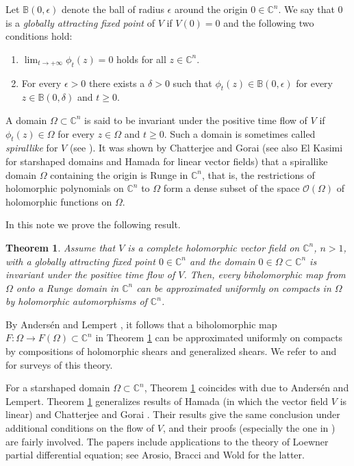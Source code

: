 \documentclass[12pt]{amsart}
\newtheorem{theorem}{Theorem}[section]
\theoremstyle{definition}
\numberwithin{equation}{section}
\numberwithin{figure}{section}
\newcommand\Oscr{\mathscr{O}}
\newcommand\B{\mathbb{B}}
\newcommand\C{\mathbb{C}}
\numberwithin{equation}{section}
\begin{document}
Let $\B(0,\epsilon)$ denote the ball of radius $\epsilon$ around 
the origin $0\in\C^n$. We say that $0$ is a 
{\em globally attracting fixed point} of $V$ if $V(0)=0$ 
and the following two conditions hold:
\begin{enumerate}
\item $\lim_{t\to+\infty}\phi_t(z) = 0$ holds for all $z\in\C^n$. 
\item For every $\epsilon>0$ there exists a $\delta>0$ such that 
$\phi_t(z)\in \B(0,\epsilon)$ for every $z\in \B(0,\delta)$ and $t\ge 0$.
\end{enumerate}
%
A domain $\Omega\subset \C^n$ 
is said to be invariant under the positive time flow of $V$ 
if $\phi_t(z)\in \Omega$ for every $z\in \Omega$ and $t\ge 0$. 
Such a domain is sometimes called {\em spirallike} for $V$ 
(see \cite{GrahamAll2008}).
It was shown by Chatterjee and Gorai  
\cite[Theorem 1.1]{ChatterjeeGorai2025X} 
(see also El Kasimi \cite{ElKasimi1988} 
for starshaped domains and Hamada \cite[Theorem 3.1]{Hamada2015} 
for linear vector fields) that a spirallike domain 
$\Omega$ containing the origin is Runge in $\C^n$, that is, the restrictions
of holomorphic polynomials on $\C^n$ to $\Omega$ form
a dense subset of the space $\Oscr(\Omega)$ of holomorphic
functions on $\Omega$. 

In this note we prove the following result.

%
%
\begin{theorem}\label{th:Runge}
Assume that $V$ is a complete holomorphic vector field 
on $\C^n$, $n>1$, with a globally attracting 
fixed point $0\in \C^n$ and the domain $0\in \Omega\subset \C^n$
is invariant under the positive time flow of $V$.
Then, every biholomorphic map from $\Omega$ 
onto a Runge domain in $\C^n$ can be approximated uniformly 
on compacts in $\Omega$ by holomorphic automorphisms of $\C^n$.
\end{theorem}

By Anders\'en and Lempert
\cite{AndersenLempert1992}, it follows that a biholomorphic map 
$F:\Omega\to F(\Omega)\subset\C^n$ in Theorem \ref{th:Runge}
can be approximated uniformly on compacts by 
compositions of holomorphic shears and generalized shears.
We refer to \cite[Chapter 4]{Forstneric2017E} 
and \cite{ForstnericKutzschebauch2022} for surveys 
of this theory.

For a starshaped domain $\Omega\subset\C^n$, Theorem 
\ref{th:Runge} coincides with \cite[Theorem 2.1]{AndersenLempert1992}
due to Anders\'en and Lempert.
Theorem \ref{th:Runge} generalizes results of Hamada 
\cite[Theorem 4.2]{Hamada2015} (in which the vector field $V$ is linear) 
and Chatterjee and Gorai \cite[V5, Theorem 1.5]{ChatterjeeGorai2025X}. 
Their results give the same conclusion under additional conditions 
on the flow of $V$, and their proofs (especially the one in 
\cite{ChatterjeeGorai2025X}) are fairly involved. 
The papers \cite{Hamada2015,ChatterjeeGorai2025X} 
include applications to the theory of Loewner 
partial differential equation; see Arosio, Bracci and Wold 
\cite{ArosioBracciWold2013} for the latter.
\end{document}
